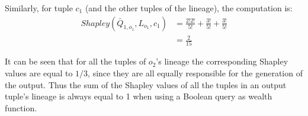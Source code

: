 \documentclass[preprint,12pt,sort&compress]{elsarticle}
\newtheorem{definition}{Definition}[section]
\begin{document}
Similarly, for tuple $c_1$ (and the other tuples of the lineage), the computation is:
\[
\begin{array}{ll}
	Shapley(\bar{Q}_{1, o_1}, L_{o_1}, c_1) & = \frac{2!2!}{5!} + \frac{3!}{5!} + \frac{3!}{5!}\\
	& = \frac{2}{15}
\end{array}
\]

It can be seen that for all the tuples of $o_2$'s lineage the corresponding Shapley values are equal to $1/3$, since they are all equally responsible for the generation of the output.
Thus the sum of the Shapley values of all the tuples in an output tuple's lineage is always equal to 1 when using a Boolean query as wealth function. 




\end{document}
